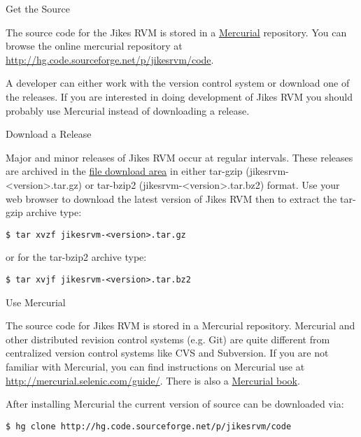 \begin{chapter}{Get the Source}
\label{cha:getthesource}

The source code for the Jikes RVM is stored in a \href{http://mercurial.selenic.com/}{Mercurial} repository. You can browse the online mercurial repository at \url{http://hg.code.sourceforge.net/p/jikesrvm/code}.

A developer can either work with the version control system or download one of the releases. If you are interested in doing development of Jikes RVM you should probably use Mercurial instead of downloading a release.

\begin{section}{Download a Release}

Major and minor releases of Jikes RVM occur at regular intervals. These releases are archived in the \href{http://sourceforge.net/projects/jikesrvm/files/}{file download area} in either tar-gzip (jikesrvm-<version>.tar.gz) or tar-bzip2 (jikesrvm-<version>.tar.bz2) format. Use your web browser to download the latest version of Jikes RVM then to extract the tar-gzip archive type:

\begin{lstlisting}
$ tar xvzf jikesrvm-<version>.tar.gz
\end{lstlisting}

or for the tar-bzip2 archive type:

\begin{lstlisting}
$ tar xvjf jikesrvm-<version>.tar.bz2
\end{lstlisting}

\end{section}

\begin{section}{Use Mercurial}

The source code for Jikes RVM is stored in a Mercurial repository. Mercurial and other distributed revision control systems (e.g. Git) are quite different from centralized version control systems like CVS and Subversion. If you are not familiar with Mercurial, you can find instructions on Mercurial use at \url{http://mercurial.selenic.com/guide/}. There is also a \href{http://hgbook.red-bean.com/}{Mercurial book}.

After installing Mercurial the current version of source can be downloaded via:

\begin{lstlisting}
$ hg clone http://hg.code.sourceforge.net/p/jikesrvm/code
\end{lstlisting}


\end{section}
\end{chapter}
